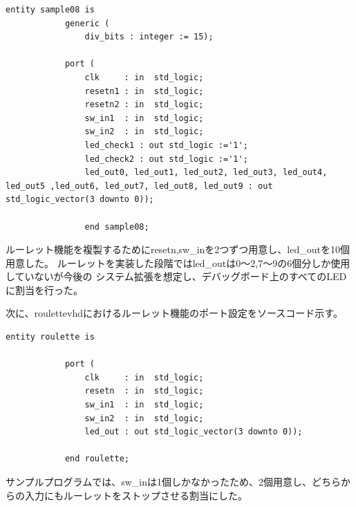 \documentclass{ltjsarticle}
\begin{document}
			\begin{lstlisting}[caption = Sample08のポート設定, label = code:Sample08port]
			entity sample08 is
			generic (
				div_bits : integer := 15);
			
			port (
				clk     : in  std_logic;
				resetn1 : in  std_logic;
				resetn2 : in  std_logic;
				sw_in1  : in  std_logic;
				sw_in2  : in  std_logic;
				led_check1 : out std_logic :='1';
				led_check2 : out std_logic :='1';
				led_out0, led_out1, led_out2, led_out3, led_out4, led_out5 ,led_out6, led_out7, led_out8, led_out9 : out std_logic_vector(3 downto 0));

				end sample08;
			\end{lstlisting}

			ルーレット機能を複製するためにresetn,sw\_inを2つずつ用意し、led\_outを10個用意した。
			ルーレットを実装した段階ではled\_outは0〜2,7〜9の6個分しか使用していないが今後の
			システム拡張を想定し、デバッグボード上のすべてのLEDに割当を行った。

			次に、roulettevhdにおけるルーレット機能のポート設定をソースコード示す。
			\begin{lstlisting}[caption = roulettevhd::ルーレット機能のポート設定, label = code:roulettePort]
			entity roulette is
			
			port (
				clk     : in  std_logic;
				resetn  : in  std_logic;
				sw_in1  : in  std_logic;
				sw_in2  : in  std_logic;
				led_out : out std_logic_vector(3 downto 0));

			end roulette;
			\end{lstlisting}
			サンプルプログラムでは、sw\_inは1個しかなかったため、2個用意し、どちらからの入力にもルーレットをストップさせる割当にした。
\end{document}
